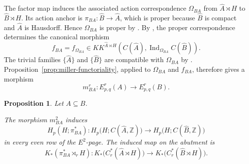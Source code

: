 \documentclass[pdflatex,sn-mathphys-num]{sn-jnl}%
\theoremstyle{plain}
\newtheorem{proposition}[theorem]{Proposition}
\theoremstyle{remark}
\theoremstyle{definition}
\numberwithin{equation}{section}
\begin{document}
The factor map induces the associated action correspondence \( \Omega_{BA} \) from \( \widehat A\rtimes H \) to \( \widehat B\rtimes H \). Its action anchor is \( \pi_{BA}\colon\widehat B\to\widehat A \), which is proper because \( \widehat B \) is compact and \( \widehat A \) is Hausdorff. Hence \( \Omega_{BA} \) is proper by \cite[Example~3.5]{miller2023functors}. By \cite[Example~5.1]{miller2025isomorphisms}, the proper correspondence determines the canonical morphism
\[
f_{BA}=f_{\Omega_{BA}}
\in
KK^{\widehat A\rtimes H}
\left(
C(\widehat A),
\operatorname{Ind}_{\Omega_{BA}}C(\widehat B)
\right).
\]
The trivial families \( \{\widehat A\} \) and \( \{\widehat B\} \) are compatible with \( \Omega_{BA} \) by \cite[Proposition~3.22]{miller2025isomorphisms}. Proposition~\ref{prop:miller-functoriality}, applied to \( \Omega_{BA} \) and \( f_{BA} \), therefore gives a morphism
\begin{equation}
\label{eq:stage-spectral-sequence-map}
m_{BA}^r:
E^r_{p,q}(A)
\longrightarrow
E^r_{p,q}(B).
\end{equation}

\begin{proposition}
\label{prop:stage-map-identification}
Let \( A\subseteq B \).

The morphism \( m_{BA}^2 \) induces
\[
H_p(H;\pi_{BA}^*):
H_p\bigl(H;C(\widehat A,\mathbb Z)\bigr)
\longrightarrow
H_p\bigl(H;C(\widehat B,\mathbb Z)\bigr)
\]
in every even row of the \( E^2 \)-page. The induced map on the abutment is
\[
K_*(\pi_{BA}^*\rtimes_rH):
K_*\bigl(C_r^*(\widehat A\rtimes H)\bigr)
\longrightarrow
K_*\bigl(C_r^*(\widehat B\rtimes H)\bigr).
\]
\end{proposition}
\end{document}
